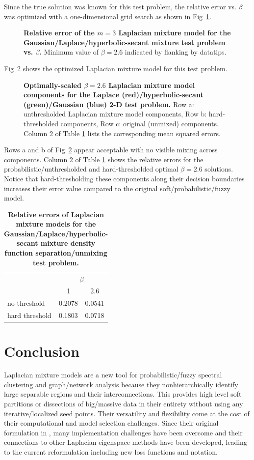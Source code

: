 \documentclass[10pt,letterpaper]{article}
\newlength\savedwidth
\newcommand\thickhline{\noalign{\global\savedwidth\arrayrulewidth\global\arrayrulewidth 2pt}%
\hline
\noalign{\global\arrayrulewidth\savedwidth}}
\begin{document}
Since the true solution was known for this test problem, the relative error vs. $\beta$ was optimized with a one-dimensional grid search as shown in Fig~\ref{fig:9}.
 \begin{figure}[!h]
 \caption{
 {\bf Relative error of the $m=3$ Laplacian mixture model for the Gaussian/Laplace/hyperbolic-secant mixture test problem vs. $\beta$.}
 Minimum value of $\beta=2.6$ indicated by flanking by datatips.
 }
 \label{fig:9}
 \end{figure}
Fig~\ref{fig:10} shows the optimized Laplacian mixture model for this test problem.
 \begin{figure}[!h]
 \caption{
 {\bf Optimally-scaled $\beta=2.6$ Laplacian mixture model components for the Laplace (red)/hyperbolic-secant (green)/Gaussian (blue) 2-D test problem.}
 Row a: unthresholded Laplacian mixture model components,
 Row b: hard-thresholded components,
 Row c: original (unmixed) components. Column 2 of Table \ref{tab:2} lists the corresponding mean squared errors.}
 \label{fig:10}
 \end{figure}
Rows a and b of Fig~\ref{fig:10} appear acceptable with no visible mixing across components.
Column 2 of Table \ref{tab:2} shows the relative errors for the probabilistic/unthresholded and hard-thresholded optimal $\beta=2.6$ solutions.
Notice that hard-thresholding these components along their decision boundaries increases their error value compared to the original soft/probabilistic/fuzzy model.
\begin{table}[!ht]
\begin{adjustwidth}{-2.25in}{0in}
\caption{
{\bf Relative errors of Laplacian mixture models for the Gaussian/Laplace/hyperbolic-secant mixture density function separation/unmixing test problem.}
}
\centering
\begin{tabular}{l|l|l}
  \multicolumn{1}{c}{} & \multicolumn{2}{c}{$\beta$}\\
  & \multicolumn{1}{|c|}{1} & \multicolumn{1}{c}{2.6} \\
  \thickhline
  no threshold   & 0.2078 & 0.0541 \\ \hline
  hard threshold & 0.1803 & 0.0718 \\ \hline
\end{tabular}
\label{tab:2}
\end{adjustwidth}
\end{table}
\section*{Conclusion}\label{sec:conclusion}
Laplacian mixture models are a new tool for probabilistic/fuzzy spectral clustering and graph/network analysis because they nonhierarchically identify large separable regions and their interconnections.
This provides high level soft partitions or dissections of big/massive data in their entirety without using any iterative/localized seed points.
Their versatility and flexibility come at the cost of their computational and model selection challenges.
Since their original formulation in \cite{korenblum}, many implementation challenges have been overcome and their connections to other Laplacian eigenspace methods have been developed, leading to the current reformulation including new loss functions and notation.
\end{document}
